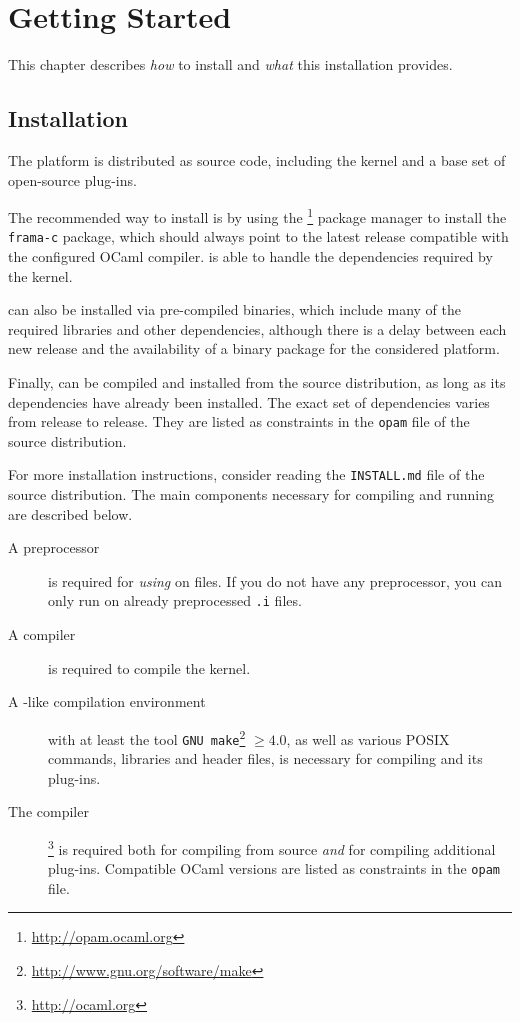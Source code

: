 \chapter{Getting Started}
\label{user-start}

This chapter describes \emph{how} to install \FramaC and
\emph{what} this installation provides.

\section{Installation}\label{sec:install}

The \FramaC platform is distributed as source code, including the \FramaC kernel
and a base set of open-source plug-ins.

The recommended way to install \FramaC is by using the
\opam{}\footnote{\url{http://opam.ocaml.org}} package manager to
install the \texttt{frama-c} package, which should always point to the latest
release compatible with the configured OCaml compiler. \opam is able to handle
the dependencies required by the \FramaC kernel.

\FramaC can also be installed via pre-compiled binaries,
which include many of the required libraries and other dependencies, although
there is a delay between each new \FramaC release and the availability of a
binary package for the considered platform.

Finally, \FramaC can be compiled and installed from the source distribution,
as long as its dependencies have already been installed. The exact set of
dependencies varies from release to release. They are listed as constraints
in the \texttt{opam} file of the source distribution.

For more installation instructions, consider reading the \texttt{INSTALL.md}
file of the source distribution. The main components necessary for compiling
and running \FramaC are described below.

\begin{description}
\item[A \C preprocessor] is required for \emph{using}
  \FramaC on \C files. If you do not have any \C preprocessor,
  you can only run \FramaC on already preprocessed \texttt{.i} files.
\item[A \C compiler] is required to compile the \FramaC
  kernel.
\item[A -like compilation environment] with at least the tool
  \texttt{GNU make}\footnote{\url{http://www.gnu.org/software/make}} $\ge 4.0$,
  as well as various POSIX commands, libraries and header files, is necessary
  for compiling \FramaC and its plug-ins.
\item[The \caml compiler]\footnote{\url{http://ocaml.org}}
  is required both for compiling \FramaC from source \emph{and} for compiling
  additional plug-ins. Compatible OCaml versions are listed as constraints in
  the \texttt{opam} file.
\end{description}

